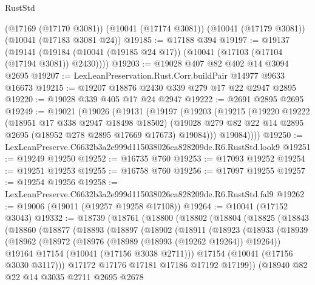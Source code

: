 \begin{lexlean}{RustStd}
\begin{coremodule}
    (@17169 (@17170 @3081))
    (@10041 (@17174 @3081))
    (@10041 (@17179 @3081))
    (@10041 (@17183 @3081 @24))
@19185 := @17188 @394
@19197 := @19137
    (@19141 (@19184 (@10041 (@19185 @24 @17)) (@10041 (@17103 (@17104 (@17194 @3081)) @2430))))
@19203 := @19028 @407 @82 @402 @14 @3094 @2695
@19207 := LexLeanPreservation.Rust.Corr.buildPair @14977 @9633 @16673
@19215 := @19207 @18876 @2430 @339 @279 @17 @22 @2947 @2895
@19220 := @19028 @339 @405 @17 @24 @2947
@19222 := @2691 @2895 @2695
@19249 := @19021
    (@19026
      (@19131
        (@19197
          (@19203
            (@19215
              (@19220
                @19222
                (@18951 @17 @338 @2947 @18498 @18502)
                (@19028 @279 @82 @22 @14 @2895 @2695 (@18952 @278 @2895 @17669 @17673) @19084)))
            @19084))))
@19250 := LexLeanPreserve.C6632b3a2e999d115038026ca828209de.R6.RustStd.look9
@19251 := @19249 @19250
@19252 := @16735 @760
@19253 := @17093 @19252
@19254 := @19251 @19253
@19255 := @16758 @760
@19256 := @17097 @19255
@19257 := @19254 @19256
@19258 := LexLeanPreserve.C6632b3a2e999d115038026ca828209de.R6.RustStd.fal9
@19262 := @19006 (@19011 (@19257 @19258 @17108))
@19264 := @10041 (@17152 @3043)
@19332 := @18739
    (@18761
      (@18800
        (@18802
          (@18804
            (@18825
              (@18843
                (@18860
                  (@18877
                    (@18893
                      (@18897
                        (@18902
                          (@18911
                            (@18923
                              (@18933
                                (@18939
                                  (@18962
                                    (@18972
                                      (@18976 (@18989 (@18993 (@19262 @19264)) @19264))
                                      @19164
                                      @17154
                                      (@10041 (@17156 @3038 @2711)))
                                    @17154
                                    (@10041 (@17156 @3030 @3117)))
                                  @17172
                                  @17176
                                  @17181
                                  @17186
                                  @17192
                                  @17199))
                              (@18940
                                @82
                                @22
                                @14
                                @3035
                                @2711
                                @2695
                                @2678

\end{coremodule}
\end{lexlean}
